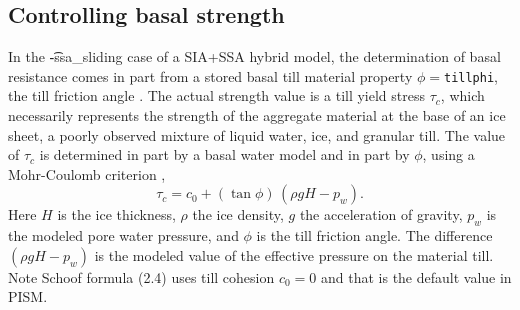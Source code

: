 \subsection{Controlling basal strength}  \label{subsect:basestrength}

In the \t{-ssa_sliding} case of a SIA+SSA hybrid model, the determination of basal resistance comes in part from a stored basal till material property $\phi=$\texttt{tillphi}, the till friction angle \cite{Paterson}.  The actual strength value is a till yield stress $\tau_c$, which necessarily represents the strength of the aggregate material at the base of an ice sheet, a poorly observed mixture of liquid water, ice, and granular till.  The value of $\tau_c$ is determined in part by a basal water model and in part by $\phi$, using a Mohr-Coulomb criterion \cite[Chapter 8]{Paterson}, 
\begin{equation*}
   \tau_c = c_{0} + (\tan\phi)\,(\rho g H - p_w).
\end{equation*}
Here $H$ is the ice thickness, $\rho$ the ice density, $g$ the acceleration of gravity, $p_w$ is the modeled pore water pressure, and $\phi$ is the till friction angle.  The difference $(\rho g H - p_w)$ is the modeled value of the effective pressure on the material till.  Note Schoof \cite{SchoofStream} formula (2.4) uses till cohesion $c_0 = 0$ and that is the default value in PISM.


